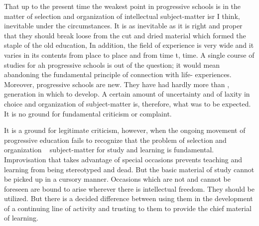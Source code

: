 That up to the present time the weakest point in progressive schools is in the matter of 
selection and organization of intellectual subject-matter isr I think, inevitable under the 
circumstances. It is as inevitable as it is right and proper that they should break loose 
from the cut and dried material which formed the staple of the old education, In addition, 
the field of experience is very wide and it varies in its contents from place to place and 
from time t, time. A single course of studies for ah progressive schools is out of the 
question; it would mean abandoning the fundamental principle of connection with life- 
experiences. Moreover, progressive schools are new. They have had hardly more than , 
generation in which to develop. A certain amount of uncertainty and of laxity in choice 
and organization of subject-matter is, therefore, what was to be expected. It is no ground 
for fundamental criticism or complaint. 

It is a ground for legitimate criticism, however, when the ongoing movement of 
progressive education fails to recognize that the problem of selection and organization ~ 
subject-matter for study and learning is fundamental. Improvisation that takes advantage 
of special occasions prevents teaching and learning from being stereotyped and dead. 
But the basic material of study cannot be picked up in a cursory manner. Occasions 
which are not and cannot be foreseen are bound to arise wherever there is intellectual 
freedom. They should be utilized. But there is a decided difference between using them in 
the development of a continuing line of activity and trusting to them to provide the chief 
material of learning. 

